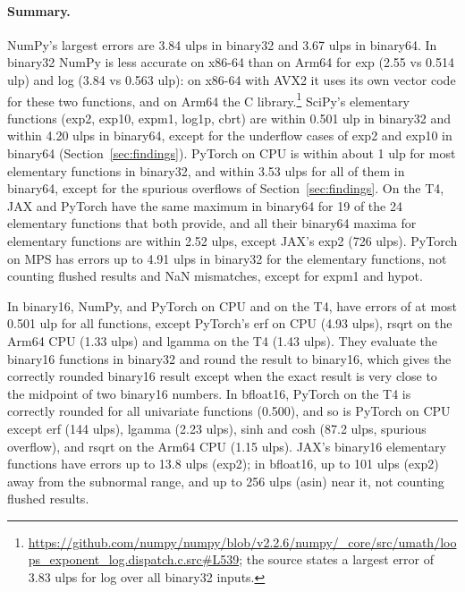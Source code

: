\documentclass[11pt,a4paper]{article}
\begin{document}















\paragraph{Summary.}
NumPy's largest errors are 3.84 ulps in binary32 and 3.67 ulps in binary64. In binary32 NumPy is less accurate on x86-64 than on Arm64 for exp (2.55 vs 0.514 ulp) and log (3.84 vs 0.563 ulp): on x86-64 with AVX2 it uses its own vector code for these two functions, and on Arm64 the C library.\footnote{\url{https://github.com/numpy/numpy/blob/v2.2.6/numpy/_core/src/umath/loops_exponent_log.dispatch.c.src\#L539}; the source states a largest error of 3.83 ulps for log over all binary32 inputs.} SciPy's elementary functions (exp2, exp10, expm1, log1p, cbrt) are within 0.501 ulp in binary32 and within 4.20 ulps in binary64, except for the underflow cases of exp2 and exp10 in binary64 (Section~\ref{sec:findings}). PyTorch on CPU is within about 1 ulp for most elementary functions in binary32, and within 3.53 ulps for all of them in binary64, except for the spurious overflows of Section~\ref{sec:findings}. On the T4, JAX and PyTorch have the same maximum in binary64 for 19 of the 24 elementary functions that both provide, and all their binary64 maxima for elementary functions are within 2.52 ulps, except JAX's exp2 (726 ulps). PyTorch on MPS has errors up to 4.91 ulps in binary32 for the elementary functions, not counting flushed results and NaN mismatches, except for expm1 and hypot.

In binary16, NumPy, and PyTorch on CPU and on the T4, have errors of at most 0.501 ulp for all functions, except PyTorch's erf on CPU (4.93 ulps), rsqrt on the Arm64 CPU (1.33 ulps) and lgamma on the T4 (1.43 ulps). They evaluate the binary16 functions in binary32 and round the result to binary16, which gives the correctly rounded binary16 result except when the exact result is very close to the midpoint of two binary16 numbers. In bfloat16, PyTorch on the T4 is correctly rounded for all univariate functions (0.500), and so is PyTorch on CPU except erf (144 ulps), lgamma (2.23 ulps), sinh and cosh (87.2 ulps, spurious overflow), and rsqrt on the Arm64 CPU (1.15 ulps). JAX's binary16 elementary functions have errors up to 13.8 ulps (exp2); in bfloat16, up to 101 ulps (exp2) away from the subnormal range, and up to 256 ulps (asin) near it, not counting flushed results.
\end{document}
